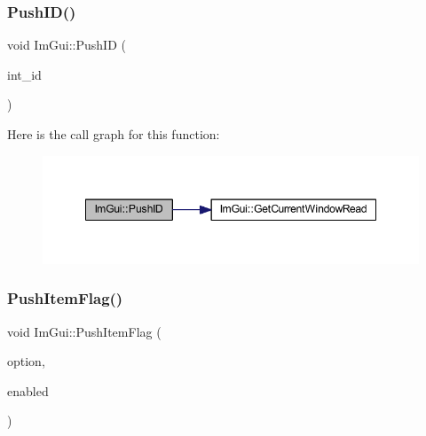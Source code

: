 \subsubsection{\texorpdfstring{Push\+I\+D()}{PushID()}\hspace{0.1cm}{\footnotesize\ttfamily [4/4]}}
{\footnotesize\ttfamily void Im\+Gui\+::\+Push\+ID (\begin{DoxyParamCaption}\item[{int}]{int\+\_\+id }\end{DoxyParamCaption})}

Here is the call graph for this function\+:
\nopagebreak
\begin{figure}[H]
\begin{center}
\leavevmode
\includegraphics[width=348pt]{namespace_im_gui_a6a11664be2a0b9a0e7054bb339e009ac_cgraph}
\end{center}
\end{figure}
\mbox{\label{namespace_im_gui_ac7301f6378333f6d17f47823eed9e00a}} 
\subsubsection{\texorpdfstring{Push\+Item\+Flag()}{PushItemFlag()}}
{\footnotesize\ttfamily void Im\+Gui\+::\+Push\+Item\+Flag (\begin{DoxyParamCaption}\item[{\mbox{\hyperlink{imgui__internal_8h_abcf9eafab4557e911b2c0d8fe2feeb38}{Im\+Gui\+Item\+Flags}}}]{option,  }\item[{bool}]{enabled }\end{DoxyParamCaption})}

